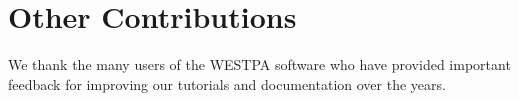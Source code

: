 \section{Other Contributions}
We thank the many users of the WESTPA software who have provided important feedback for improving our tutorials and documentation over the years.  